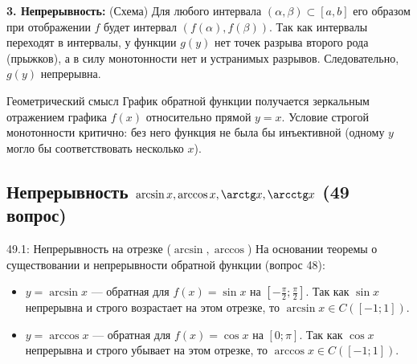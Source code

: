 \documentclass[a4paper,12pt]{article}
\begin{document}
	\vspace{0.5cm}
	\textbf{3. Непрерывность:} (Схема)
	Для любого интервала $(\alpha, \beta) \subset [a, b]$ его образом при отображении $f$ будет интервал $(f(\alpha), f(\beta))$. Так как интервалы переходят в интервалы, у функции $g(y)$ нет точек разрыва второго рода (прыжков), а в силу монотонности нет и устранимых разрывов. Следовательно, $g(y)$ непрерывна.
	
	\vspace{0.5cm}
	\begin{importantbox}{Геометрический смысл}
		График обратной функции получается зеркальным отражением графика $f(x)$ относительно прямой $y = x$. Условие строгой монотонности критично: без него функция не была бы инъективной (одному $y$ могло бы соответствовать несколько $x$).
	\end{importantbox}
	
	
	
	
	\vspace{1cm}
	\subsection{Непрерывность $\arcsin x, \arccos x, \arctg x, \arcctg x$ (49 вопрос)}
	
	\begin{theorembox}{{49.1: Непрерывность на отрезке ($\arcsin, \arccos$)}}
		На основании теоремы о существовании и непрерывности обратной функции (вопрос 48):
		\begin{itemize}
			\item $y = \arcsin x$ — обратная для $f(x) = \sin x$ на $[-\frac{\pi}{2}; \frac{\pi}{2}]$. Так как $\sin x$ непрерывна и строго возрастает на этом отрезке, то $\arcsin x \in C([-1; 1])$.
			\item $y = \arccos x$ — обратная для $f(x) = \cos x$ на $[0; \pi]$. Так как $\cos x$ непрерывна и строго убывает на этом отрезке, то $\arccos x \in C([-1; 1])$.
		\end{itemize}
	\end{theorembox}
	
	\begin{center}
	\end{center}
	
\end{document}
